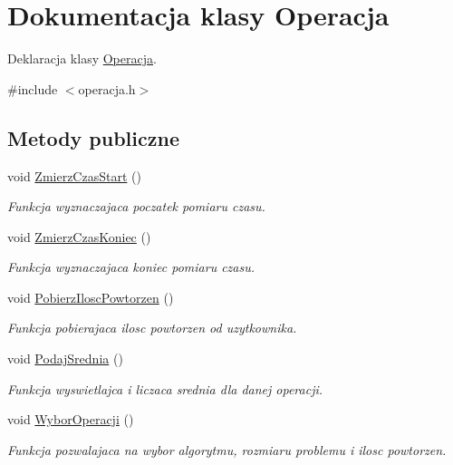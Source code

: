 \hypertarget{class_operacja}{\section{Dokumentacja klasy Operacja}
\label{class_operacja}
}


Deklaracja klasy \hyperlink{class_operacja}{Operacja}.  




{\ttfamily \#include $<$operacja.\-h$>$}

\subsection*{Metody publiczne}
\begin{DoxyCompactItemize}
\item 
void \hyperlink{class_operacja_a8a31476894d307c400f965dd3dfcbb46}{Zmierz\-Czas\-Start} ()
\begin{DoxyCompactList}\small\item\em Funkcja wyznaczajaca poczatek pomiaru czasu. \end{DoxyCompactList}\item 
void \hyperlink{class_operacja_a0be771c3a85d8a53d5dba677f8cc6959}{Zmierz\-Czas\-Koniec} ()
\begin{DoxyCompactList}\small\item\em Funkcja wyznaczajaca koniec pomiaru czasu. \end{DoxyCompactList}\item 
void \hyperlink{class_operacja_a3f6cb38d924c260711fad70fe0eed35f}{Pobierz\-Ilosc\-Powtorzen} ()
\begin{DoxyCompactList}\small\item\em Funkcja pobierajaca ilosc powtorzen od uzytkownika. \end{DoxyCompactList}\item 
void \hyperlink{class_operacja_a26c10d244f0cd7b2c22e810476ee9380}{Podaj\-Srednia} ()
\begin{DoxyCompactList}\small\item\em Funkcja wyswietlajca i liczaca srednia dla danej operacji. \end{DoxyCompactList}\item 
void \hyperlink{class_operacja_a78c30760d29ccd38944962e6c71fee13}{Wybor\-Operacji} ()
\begin{DoxyCompactList}\small\item\em Funkcja pozwalajaca na wybor algorytmu, rozmiaru problemu i ilosc powtorzen. \end{DoxyCompactList}\item 

\end{DoxyCompactItemize}
